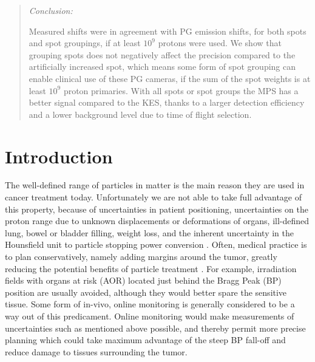 \documentclass[a4paper,english]{article}
\begin{document}
\begin{abstract}
\emph{Conclusion:} 

Measured shifts were in agreement with PG emission shifts, for both spots and spot groupings, if at least $10^9$ protons were used. We show that grouping spots does not negatively affect the precision compared to the artificially increased spot, which means some form of spot grouping can enable clinical use of these PG cameras, if the sum of the spot weights is at least $10^9$ proton primaries. With all spots or spot groups the MPS has a better signal compared to the KES, thanks to a larger detection efficiency and a lower background level due to time of flight selection.

\end{abstract}


\section{Introduction}

The well-defined range of particles in matter is the main reason they are used in cancer treatment today. Unfortunately we are not able to take full advantage of this property, because of uncertainties in patient positioning, uncertainties on the proton range due to unknown displacements or deformations of organs, ill-defined lung, bowel or bladder filling, weight loss, and the inherent uncertainty in the Hounsfield unit to particle stopping power conversion \citep{Paganetti2013}. Often, medical practice is to plan conservatively, namely adding margins around the tumor, greatly reducing the potential benefits of particle treatment \citep{Knopf2013}. For example, irradiation fields with organs at risk (AOR) located just behind the Bragg Peak (BP) position are usually avoided, although they would better spare the sensitive tissue. Some form of in-vivo, online monitoring is generally considered to be a way out of this predicament. Online monitoring would make measurements of uncertainties such as mentioned above possible, and thereby permit more precise planning which could take maximum advantage of the steep BP fall-off and reduce damage to tissues surrounding the tumor.
\end{document}
